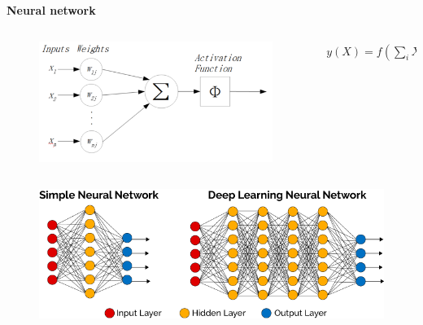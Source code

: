 \documentclass[xcolor=dvipsnames]{beamer}
\begin{document}
\begin{frame}{\bf Neural network}

\begin{columns}
    \begin{column}{0.4\textwidth}

    \begin{figure}
      \includegraphics[scale=0.3]{../../diagrams/neuron_model.png}
    \end{figure}

    \end{column}

    \begin{column}{0.5\textwidth}  %

    \begin{align*}
     y(X) = f(\sum_{i} X_iW_i + b)
    \end{align*}

    \end{column}

\end{columns}


  \begin{figure}
    \includegraphics[scale=0.2]{../../diagrams/deep_nn.png}
  \end{figure}


\end{frame}
\end{document}

